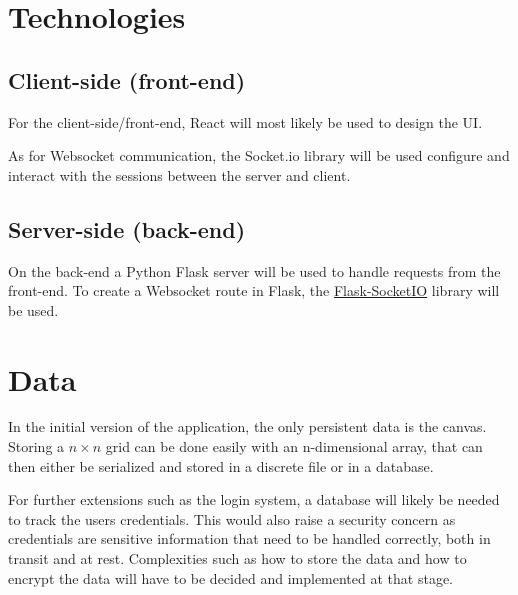 \clearpage

\section{Technologies}\label{sec:technologies}

\subsection{Client-side (front-end)}\label{subsec:client-side-(front-end)}

For the client-side/front-end, React will most likely be used to design the UI.

As for Websocket communication, the Socket.io library will be used configure and interact with the sessions between the server and client.

\subsection{Server-side (back-end)}\label{subsec:server-side-(back-end)}

On the back-end a Python Flask server will be used to handle requests from the front-end.
To create a Websocket route in Flask, the \href{https://flask-socketio.readthedocs.io/}{Flask-SocketIO} library will be used.

\section{Data}\label{sec:data}

In the initial version of the application, the only persistent data is the canvas.
Storing a $n\times n$ grid can be done easily with an n-dimensional array, that can then either be serialized and stored in a discrete file or in a database.

For further extensions such as the login system, a database will likely be needed to track the users credentials.
This would also raise a security concern as credentials are sensitive information that need to be handled correctly, both in transit and at rest.
Complexities such as how to store the data and how to encrypt the data will have to be decided and implemented at that stage.
